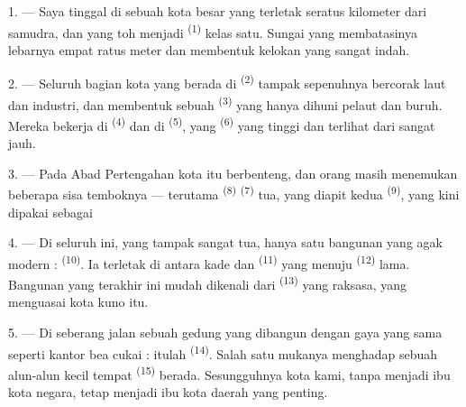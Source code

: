 \VUsaut{2.0mm}
\VUsaut{3.0mm}
\VUfilet{16mm}
\VUsaut{5.6mm}
\VUsaut{1.4mm}
\VUsaut{2.2mm}

\VUsaut{3.0mm}

1. --- Saya tinggal di sebuah kota besar yang terletak seratus
kilometer dari samudra, dan yang toh menjadi 
\textsuperscript{(1)} kelas satu. Sungai yang membatasinya lebarnya
empat ratus meter dan membentuk kelokan yang sangat indah.

2. --- Seluruh bagian kota yang berada di 
\textsuperscript{(2)} tampak sepenuhnya bercorak laut dan industri, dan
membentuk sebuah  \textsuperscript{(3)} yang
hanya dihuni pelaut dan buruh. Mereka bekerja di 
\textsuperscript{(4)} dan di  \textsuperscript{(5)},
yang  \textsuperscript{(6)} yang tinggi dan
 terlihat dari sangat jauh.

3. --- Pada Abad Pertengahan kota itu berbenteng, dan orang masih
menemukan beberapa sisa temboknya — terutama 
\textsuperscript{(8)}  \textsuperscript{(7)}
tua, yang diapit kedua  \textsuperscript{(9)}, yang
kini dipakai sebagai 

4. --- Di seluruh  ini, yang tampak sangat tua, hanya
satu bangunan yang agak modern : 
\textsuperscript{(10)}. Ia terletak di antara kade dan 
\textsuperscript{(11)} yang menuju 
\textsuperscript{(12)} lama. Bangunan yang terakhir ini mudah dikenali
dari  \textsuperscript{(13)} yang raksasa,
yang menguasai kota kuno itu.

5. --- Di seberang jalan  sebuah gedung yang dibangun
dengan gaya yang sama seperti kantor bea cukai : itulah 
\textsuperscript{(14)}. Salah satu mukanya menghadap sebuah alun-alun
kecil tempat  \textsuperscript{(15)} berada.
Sesungguhnya kota kami, tanpa menjadi ibu kota negara, tetap menjadi
ibu kota daerah yang penting.

\VUsaut{5.0mm}
\VUsaut{3.4mm}

